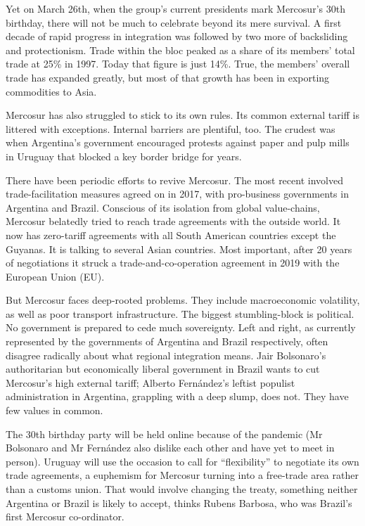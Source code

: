\documentclass{article}
\begin{document}
Yet on March 26th, when the group's current presidents mark Mercosur's 30th birthday, there will not be much to celebrate beyond its mere survival. A first decade of rapid progress in integration was followed by two more of backsliding and protectionism. Trade within the bloc peaked as a share of its members' total trade at 25\% in 1997. Today that figure is just 14\%. True, the members' overall trade has expanded greatly, but most of that growth has been in exporting commodities to Asia. 

Mercosur has also struggled to stick to its own rules. Its common external tariff is littered with exceptions. Internal barriers are plentiful, too. The crudest was when Argentina's government encouraged protests against paper and pulp mills in Uruguay that blocked a key border bridge for years. 

There have been periodic efforts to revive Mercosur. The most recent involved trade-facilitation measures agreed on in 2017, with pro-business governments in Argentina and Brazil. Conscious of its isolation from global value-chains, Mercosur belatedly tried to reach trade agreements with the outside world. It now has zero-tariff agreements with all South American countries except the Guyanas. It is talking to several Asian countries. Most important, after 20 years of negotiations it struck a trade-and-co-operation agreement in 2019 with the European Union (EU). 

But Mercosur faces deep-rooted problems. They include macroeconomic volatility, as well as poor transport infrastructure. The biggest stumbling-block is political. No government is prepared to cede much sovereignty. Left and right, as currently represented by the governments of Argentina and Brazil respectively, often disagree radically about what regional integration means. Jair Bolsonaro's authoritarian but economically liberal government in Brazil wants to cut Mercosur's high external tariff; Alberto Fernández's leftist populist administration in Argentina, grappling with a deep slump, does not. They have few values in common. 

The 30th birthday party will be held online because of the pandemic (Mr Bolsonaro and Mr Fernández also dislike each other and have yet to meet in person). Uruguay will use the occasion to call for ``flexibility'' to negotiate its own trade agreements, a euphemism for Mercosur turning into a free-trade area rather than a customs union. That would involve changing the treaty, something neither Argentina or Brazil is likely to accept, thinks Rubens Barbosa, who was Brazil's first Mercosur co-ordinator. 
\end{document}
